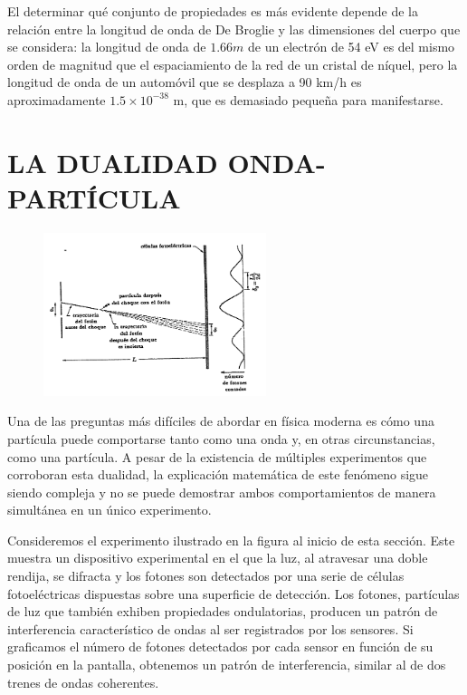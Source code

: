 \documentclass[a4paper]{article}
\begin{document}
    \newpage
    \noindent
    \thispagestyle{fancy}

El determinar qué conjunto de propiedades es más evidente depende de la relación entre la longitud de onda de De Broglie y las dimensiones del cuerpo que se considera: la longitud de onda de {$1.66m$} de un electrón de 54 eV es del mismo orden de magnitud que el espaciamiento de la red de un cristal de níquel, pero la longitud de onda de un automóvil que se desplaza a 90 km/h es aproximadamente $1.5 \times 10^{-38}$ m, que es demasiado pequeña para manifestarse.

\section{LA DUALIDAD ONDA-PARTÍCULA}

    \begin{figure}[h!]
        \centering
        \includegraphics[width = 6.5cm]{../expDualidadOP.png}
    \end{figure}

    \indent Una de las preguntas más difíciles de abordar en física moderna es cómo una partícula puede comportarse tanto como una onda y, en otras circunstancias, como una partícula. A pesar de la existencia de múltiples experimentos que corroboran esta dualidad, la explicación matemática de este fenómeno sigue siendo compleja y no se puede demostrar ambos comportamientos de manera simultánea en un único experimento.

    \indent Consideremos el experimento ilustrado en la figura al inicio de esta sección. Este muestra un dispositivo experimental en el que la luz, al atravesar una doble rendija, se difracta y los fotones son detectados por una serie de células fotoeléctricas dispuestas sobre una superficie de detección. Los fotones, partículas de luz que también exhiben propiedades ondulatorias, producen un patrón de interferencia característico de ondas al ser registrados por los sensores. Si graficamos el número de fotones detectados por cada sensor en función de su posición en la pantalla, obtenemos un patrón de interferencia, similar al de dos trenes de ondas coherentes.\\
\end{document}
